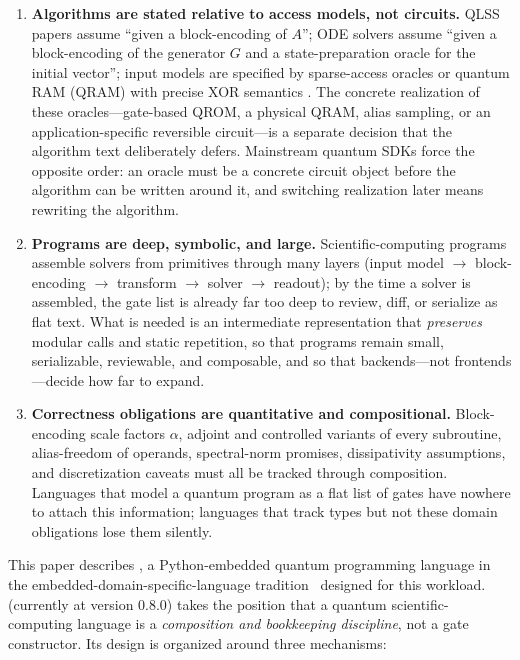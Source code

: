 \begin{enumerate}
\item \textbf{Algorithms are stated relative to access models, not circuits.}
  QLSS papers assume ``given a block-encoding of $A$''; ODE solvers assume
  ``given a block-encoding of the generator $G$ and a state-preparation
  oracle for the initial vector''; input models are specified by sparse-access
  oracles or quantum RAM (QRAM) with precise XOR semantics
  \cite{giovannetti2008qram,dervovic2018qlss}.  The concrete realization of
  these oracles---gate-based QROM, a physical QRAM, alias sampling, or an
  application-specific reversible circuit---is a separate decision that the
  algorithm text deliberately defers.  Mainstream quantum SDKs force the
  opposite order: an oracle must be a concrete circuit object before the
  algorithm can be written around it, and switching realization later means
  rewriting the algorithm.
\item \textbf{Programs are deep, symbolic, and large.}  Scientific-computing
  programs assemble solvers from primitives through many layers (input model
  $\rightarrow$ block-encoding $\rightarrow$ transform $\rightarrow$ solver
  $\rightarrow$ readout); by the time a solver is assembled, the gate list is
  already far too deep to review, diff, or serialize as flat text.  What is
  needed is an intermediate
  representation that \emph{preserves} modular calls and static repetition,
  so that programs remain small, serializable, reviewable, and composable,
  and so that backends---not frontends---decide how far to expand.
\item \textbf{Correctness obligations are quantitative and compositional.}
  Block-encoding scale factors $\alpha$, adjoint and controlled variants of
  every subroutine, alias-freedom of operands, spectral-norm promises,
  dissipativity assumptions, and discretization caveats must all be tracked
  through composition.  Languages that model a quantum program as a flat list
  of gates have nowhere to attach this information; languages that track types
  but not these domain obligations lose them silently.
\end{enumerate}

This paper describes \pqlang, a Python-embedded quantum programming language in the embedded-domain-specific-language tradition~\cite{hudak1996building,liu2013chiselq}
designed for this workload.  \pqlang{} (currently at version 0.8.0) takes the
position that a quantum scientific-computing language is a
\emph{composition and bookkeeping discipline}, not a gate constructor.  Its
design is organized around three mechanisms:

